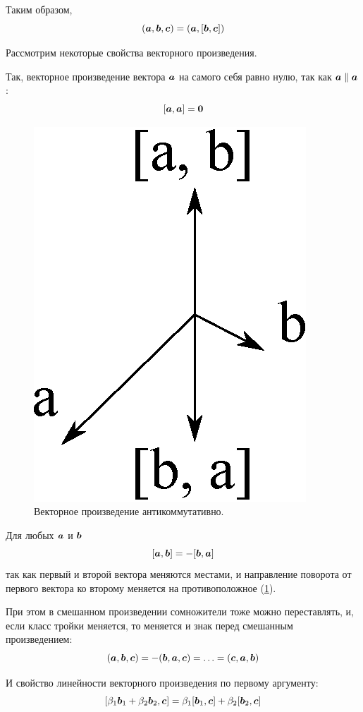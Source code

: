 \documentclass[a4paper,12pt]{article}
\begin{document}
  Таким образом,
  \begin{equation}\label{eq:triple-as-scalar-and-vector}
    (\boldsymbol a, \boldsymbol b, \boldsymbol c) = (\boldsymbol a, [\boldsymbol b, \boldsymbol c])
  \end{equation}
  
  Рассмотрим некоторые свойства векторного произведения.
  
  Так, векторное произведение вектора $\boldsymbol a$ на самого себя равно нулю, так как $\bds a \hm\parallel \bds a$:
  \[
    [\boldsymbol a, \boldsymbol a] = \boldsymbol 0
  \]
  
  \begin{figure}[h]
    \centering
    
    \includegraphics[width=0.25\columnwidth]{ab-ba}
    
    \caption{Векторное произведение антикоммутативно.}
    \label{fig:ab-ba}
  \end{figure}
    
  Для любых $\boldsymbol a$ и $\boldsymbol b$
  \[
    [\boldsymbol a, \boldsymbol b] = -[\boldsymbol b, \boldsymbol a]
  \]
  так как первый и второй вектора меняются местами, и направление поворота от первого вектора ко второму меняется на противоположное (\ref{fig:ab-ba}).
  
  При этом в смешанном произведении сомножители тоже можно переставлять, и, если класс тройки меняется, то меняется и знак перед смешанным произведением:
  \begin{equation}\label{eq:triple-change-order}
    (\boldsymbol a, \boldsymbol b, \boldsymbol c) = -(\boldsymbol b, \boldsymbol a, \boldsymbol c) = \ldots = (\boldsymbol c, \boldsymbol a, \boldsymbol b)
  \end{equation}

  И свойство линейности векторного произведения по первому аргументу:
  \[
    [\beta_1 \boldsymbol b_1 + \beta_2 \boldsymbol b_2, \boldsymbol c] = \beta_1 [\boldsymbol b_1, \boldsymbol c] + \beta_2 [\boldsymbol b_2, \boldsymbol c]
  \]
  
\end{document}
